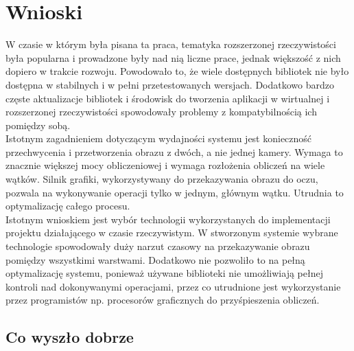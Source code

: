 \documentclass[a4paper,11pt,twoside]{report}
\theoremstyle{definition}
\begin{document}
\section{Wnioski}

W czasie w którym była pisana ta praca, tematyka rozszerzonej rzeczywistości była popularna i prowadzone były nad nią liczne prace, jednak większość z nich dopiero w trakcie rozwoju. Powodowało to, że wiele dostępnych bibliotek nie było dostępna w stabilnych i w pełni przetestowanych wersjach. Dodatkowo bardzo częste aktualizacje bibliotek i środowisk do tworzenia aplikacji w wirtualnej i rozszerzonej rzeczywistości spowodowały problemy z kompatybilnością ich pomiędzy sobą. \\
Istotnym zagadnieniem dotyczącym wydajności systemu jest konieczność przechwycenia i przetworzenia obrazu z dwóch, a nie jednej kamery. Wymaga to znacznie większej mocy obliczeniowej i wymaga rozłożenia obliczeń na wiele wątków. Silnik grafiki, wykorzystywany do przekazywania obrazu do oczu, pozwala na wykonywanie operacji tylko w jednym, głównym wątku. Utrudnia to optymalizację całego procesu. \\
Istotnym wnioskiem jest wybór technologii wykorzystanych do implementacji projektu działającego w czasie rzeczywistym. W stworzonym systemie wybrane technologie spowodowały duży narzut czasowy na przekazywanie obrazu pomiędzy wszystkimi warstwami. Dodatkowo nie pozwoliło to na pełną optymalizację systemu, ponieważ używane biblioteki nie umożliwiają pełnej kontroli nad dokonywanymi operacjami, przez co utrudnione jest wykorzystanie przez programistów np. procesorów graficznych do przyśpieszenia obliczeń.

\subsection{Co wyszło dobrze}
\end{document}
